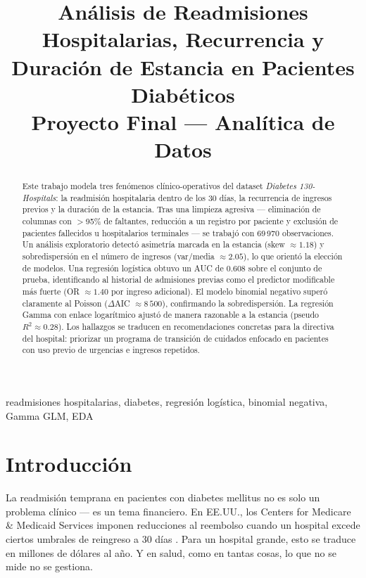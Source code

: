\documentclass[conference]{IEEEtran}
\begin{document}
\title{Análisis de Readmisiones Hospitalarias, Recurrencia y Duración de Estancia en Pacientes Diabéticos\\
\large Proyecto Final --- Analítica de Datos}

\author{
}

\maketitle

\begin{abstract}
Este trabajo modela tres fenómenos clínico-operativos del dataset \textit{Diabetes 130-Hospitals}: la readmisión hospitalaria dentro de los 30 días, la recurrencia de ingresos previos y la duración de la estancia. Tras una limpieza agresiva --- eliminación de columnas con $>$95\% de faltantes, reducción a un registro por paciente y exclusión de pacientes fallecidos u hospitalarios terminales --- se trabajó con 69\,970 observaciones. Un análisis exploratorio detectó asimetría marcada en la estancia (skew $\approx 1.18$) y sobredispersión en el número de ingresos (var/media $\approx 2.05$), lo que orientó la elección de modelos. Una regresión logística obtuvo un AUC de 0.608 sobre el conjunto de prueba, identificando al historial de admisiones previas como el predictor modificable más fuerte (OR $\approx 1.40$ por ingreso adicional). El modelo binomial negativo superó claramente al Poisson ($\Delta$AIC $\approx 8\,500$), confirmando la sobredispersión. La regresión Gamma con enlace logarítmico ajustó de manera razonable a la estancia (pseudo $R^2 \approx 0.28$). Los hallazgos se traducen en recomendaciones concretas para la directiva del hospital: priorizar un programa de transición de cuidados enfocado en pacientes con uso previo de urgencias e ingresos repetidos.
\end{abstract}

\begin{IEEEkeywords}
readmisiones hospitalarias, diabetes, regresión logística, binomial negativa, Gamma GLM, EDA
\end{IEEEkeywords}

\section{Introducción}
La readmisión temprana en pacientes con diabetes mellitus no es solo un problema clínico --- es un tema financiero. En EE.UU., los Centers for Medicare \& Medicaid Services imponen reducciones al reembolso cuando un hospital excede ciertos umbrales de reingreso a 30 días \cite{cms_hrrp}. Para un hospital grande, esto se traduce en millones de dólares al año. Y en salud, como en tantas cosas, lo que no se mide no se gestiona.
\end{document}
